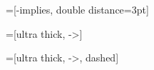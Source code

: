 =[-implies, double distance=3pt]

=[ultra thick, ->]

=[ultra thick, ->, dashed]

\newcommand{\inode}[3][]{
  \node[draw, shape=circle, minimum width=0.5cm, #1] (#2) at (#3) {};
  \node[fill, shape=circle, #1] () at (#3) {};
}

\newcommand{\nnode}[3][]{
  \node[fill, shape=circle, #1] (#2) at (#3) {};
}

